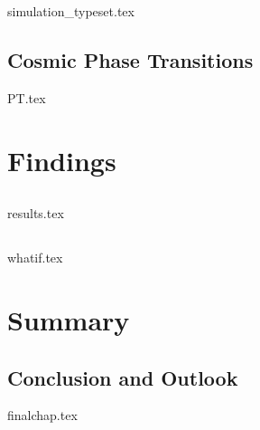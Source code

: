 \documentclass[UKenglish]{texmex/uiomasterthesis}
\begin{document}
{{simulation_typeset.tex}


\chapter{Cosmic Phase Transitions}\label{chap:PT}
    {{PT.tex}}

















\part{Findings}\label{part:findings}



\chapter{}\label{chap:results}
    {{results.tex}}


\chapter{}\label{chap:whatif}
    {{whatif.tex}}

}






\part*{Summary} %


\chapter{Conclusion and Outlook}
    {{finalchap.tex}}
\end{document}
